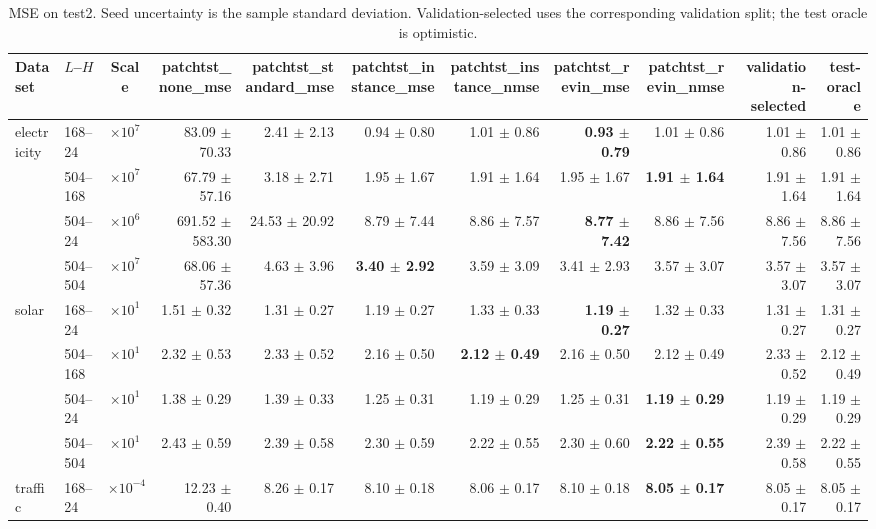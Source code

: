 \begin{table}[htbp]
\centering
\caption{MSE on test2. Seed uncertainty is the sample standard deviation. Validation-selected uses the corresponding validation split; the test oracle is optimistic.}
\begin{tabular}{llcrrrrrrr|r}
\toprule
Dataset & $L$--$H$ & Scale & patchtst\_none\_mse & patchtst\_standard\_mse & patchtst\_instance\_mse & patchtst\_instance\_nmse & patchtst\_revin\_mse & patchtst\_revin\_nmse & validation-selected & test-oracle \\
\midrule
electricity & 168--24 & $\times 10^{7}$ & 83.09 $\pm$ 70.33 & 2.41 $\pm$ 2.13 & 0.94 $\pm$ 0.80 & 1.01 $\pm$ 0.86 & \textbf{0.93 $\pm$ 0.79} & 1.01 $\pm$ 0.86 & 1.01 $\pm$ 0.86 & 1.01 $\pm$ 0.86 \\
 & 504--168 & $\times 10^{7}$ & 67.79 $\pm$ 57.16 & 3.18 $\pm$ 2.71 & 1.95 $\pm$ 1.67 & 1.91 $\pm$ 1.64 & 1.95 $\pm$ 1.67 & \textbf{1.91 $\pm$ 1.64} & 1.91 $\pm$ 1.64 & 1.91 $\pm$ 1.64 \\
 & 504--24 & $\times 10^{6}$ & 691.52 $\pm$ 583.30 & 24.53 $\pm$ 20.92 & 8.79 $\pm$ 7.44 & 8.86 $\pm$ 7.57 & \textbf{8.77 $\pm$ 7.42} & 8.86 $\pm$ 7.56 & 8.86 $\pm$ 7.56 & 8.86 $\pm$ 7.56 \\
 & 504--504 & $\times 10^{7}$ & 68.06 $\pm$ 57.36 & 4.63 $\pm$ 3.96 & \textbf{3.40 $\pm$ 2.92} & 3.59 $\pm$ 3.09 & 3.41 $\pm$ 2.93 & 3.57 $\pm$ 3.07 & 3.57 $\pm$ 3.07 & 3.57 $\pm$ 3.07 \\
\midrule
solar & 168--24 & $\times 10^{1}$ & 1.51 $\pm$ 0.32 & 1.31 $\pm$ 0.27 & 1.19 $\pm$ 0.27 & 1.33 $\pm$ 0.33 & \textbf{1.19 $\pm$ 0.27} & 1.32 $\pm$ 0.33 & 1.31 $\pm$ 0.27 & 1.31 $\pm$ 0.27 \\
 & 504--168 & $\times 10^{1}$ & 2.32 $\pm$ 0.53 & 2.33 $\pm$ 0.52 & 2.16 $\pm$ 0.50 & \textbf{2.12 $\pm$ 0.49} & 2.16 $\pm$ 0.50 & 2.12 $\pm$ 0.49 & 2.33 $\pm$ 0.52 & 2.12 $\pm$ 0.49 \\
 & 504--24 & $\times 10^{1}$ & 1.38 $\pm$ 0.29 & 1.39 $\pm$ 0.33 & 1.25 $\pm$ 0.31 & 1.19 $\pm$ 0.29 & 1.25 $\pm$ 0.31 & \textbf{1.19 $\pm$ 0.29} & 1.19 $\pm$ 0.29 & 1.19 $\pm$ 0.29 \\
 & 504--504 & $\times 10^{1}$ & 2.43 $\pm$ 0.59 & 2.39 $\pm$ 0.58 & 2.30 $\pm$ 0.59 & 2.22 $\pm$ 0.55 & 2.30 $\pm$ 0.60 & \textbf{2.22 $\pm$ 0.55} & 2.39 $\pm$ 0.58 & 2.22 $\pm$ 0.55 \\
\midrule
traffic & 168--24 & $\times 10^{-4}$ & 12.23 $\pm$ 0.40 & 8.26 $\pm$ 0.17 & 8.10 $\pm$ 0.18 & 8.06 $\pm$ 0.17 & 8.10 $\pm$ 0.18 & \textbf{8.05 $\pm$ 0.17} & 8.05 $\pm$ 0.17 & 8.05 $\pm$ 0.17 \\

\end{tabular}
\end{table}
